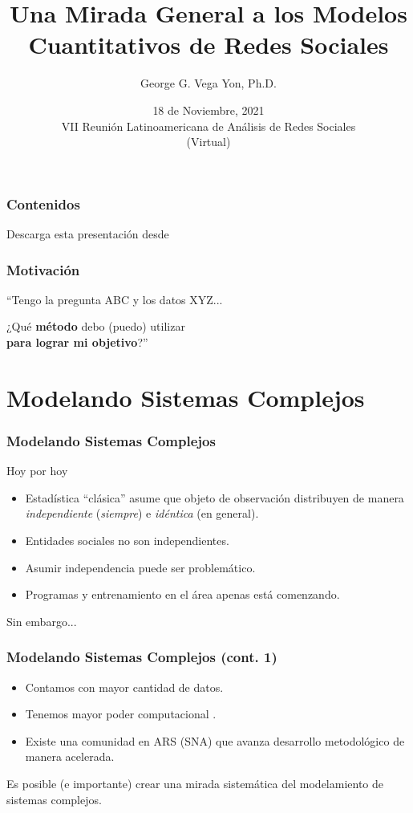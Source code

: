 \documentclass[aspectratio=169,10pt]{beamer}
\title[Modelos Cuant. de Redes Sociales]{Una Mirada General a los Modelos Cuantitativos de Redes Sociales}
\author[ggvy.cl]{George G. Vega Yon, Ph.D.}
\date{18 de Noviembre, 2021\\VII Reunión Latinoamericana de Análisis de Redes Sociales\\(Virtual)}
\institute[UofU Epi]{Division of Epidemiology\\University of Utah}
\begin{document}

\begin{frame}
	\frametitle{Contenidos}
\tableofcontents\pause
\vfill\hfill%
Descarga esta presentación desde \href{https://ggv.cl/slides/ars2021}{}
\end{frame}

\begin{frame}
	\frametitle{Motivación}
	``Tengo la pregunta ABC y los datos XYZ...\pause \bigskip
	\hfill\begin{minipage}{.8\linewidth}
		\raggedleft
		\Large ¿Qué \textbf{método} debo (puedo) utilizar\\\textbf{para lograr mi objetivo}?''
	\end{minipage}
\end{frame}

\section{Modelando Sistemas Complejos}


\begin{frame}
	\frametitle{Modelando Sistemas Complejos}
	Hoy por hoy
	\pause
	\begin{itemize}
		\item Estadística ``clásica'' asume que objeto de observación distribuyen de manera \textit{independiente} (\textit{siempre}) e \textit{idéntica}\pause{} (en general).\pause
		\item Entidades sociales no son independientes.\pause
		\item Asumir independencia puede ser problemático.\pause
		\item Programas y entrenamiento en el área apenas está comenzando.
	\end{itemize}\pause
	\vfill\hfill Sin embargo...
	\end{frame}

\begin{frame}
	\frametitle{Modelando Sistemas Complejos (cont. 1)}
	\begin{itemize}
		\item Contamos con mayor cantidad de datos.\pause
		\item Tenemos mayor poder computacional \parencite{Hofman2021,Lazer2020}.\pause
		\item Existe una comunidad en ARS (SNA) que avanza desarrollo metodológico de manera acelerada.\pause
\end{itemize}

\vfill\hfill\large Es posible (e importante) crear una mirada sistemática del modelamiento de sistemas complejos.

\end{frame}
\end{document}
